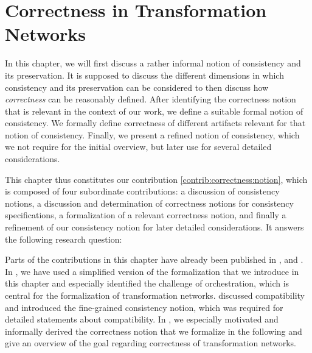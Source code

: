 \chapter{Correctness in Transformation Networks
}
\label{chap:correctness}


In this chapter, we will first discuss a rather informal notion of consistency and its preservation. It is supposed to discuss the different dimensions in which consistency and its preservation can be considered to then discuss how \emph{correctness} can be reasonably defined.
After identifying the correctness notion that is relevant in the context of our work, we define a suitable formal notion of consistency.
We formally define correctness of different artifacts relevant for that notion of consistency.
Finally, we present a refined notion of consistency, which we not require for the initial overview, but later use for several detailed considerations.

This chapter thus constitutes our contribution \autoref{contrib:correctness:notion}, which is composed of four subordinate contributions: a discussion of consistency notions, a discussion and determination of correctness notions for consistency specifications, a formalization of a relevant correctness notion, and finally a refinement of our consistency notion for later detailed considerations.
It answers the following research question:


Parts of the contributions in this chapter have already been published in ,  and .
In , we have used a simplified version of the formalization that we introduce in this chapter and especially identified the challenge of orchestration, which is central for the formalization of transformation networks.
 discussed compatibility and introduced the fine-grained consistency notion, which was required for detailed statements about compatibility.
In , we especially motivated and informally derived the correctness notion that we formalize in the following and give an overview of the goal regarding correctness of transformation networks.


